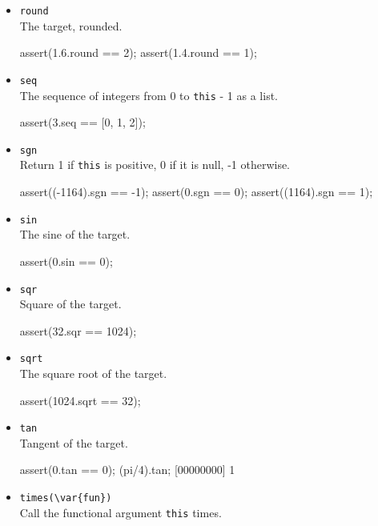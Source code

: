\begin{itemize}
\item \lstinline|round|\\
  The target, rounded.
\begin{urbiscript}[firstnumber=last]
assert(1.6.round == 2);
assert(1.4.round == 1);
\end{urbiscript}

\item \lstinline|seq|\\
  The sequence of integers from 0 to \lstinline|this| - 1 as a list.
\begin{urbiscript}[firstnumber=last]
assert(3.seq == [0, 1, 2]);
\end{urbiscript}

\item \lstinline|sgn|\\
  Return 1 if \lstinline|this| is positive, 0 if it is null, -1
  otherwise.
\begin{urbiscript}[firstnumber=last]
assert((-1164).sgn == -1);
assert(0.sgn       == 0);
assert((1164).sgn  == 1);
\end{urbiscript}

\item \lstinline|sin|\\
  The sine of the target.
\begin{urbiscript}[firstnumber=last]
assert(0.sin == 0);
\end{urbiscript}

\item \lstinline|sqr|\\
  Square of the target.
\begin{urbiscript}[firstnumber=last]
assert(32.sqr == 1024);
\end{urbiscript}

\item \lstinline|sqrt|\\
  The square root of the target.
\begin{urbiscript}[firstnumber=last]
assert(1024.sqrt == 32);
\end{urbiscript}

\item \lstinline|tan|\\
  Tangent of the target.
\begin{urbiscript}[firstnumber=last]
assert(0.tan == 0);
(pi/4).tan;
[00000000] 1
\end{urbiscript}

\item \lstinline|times(\var{fun})|\\
  Call the functional argument  \lstinline|this| times.


\end{itemize}
